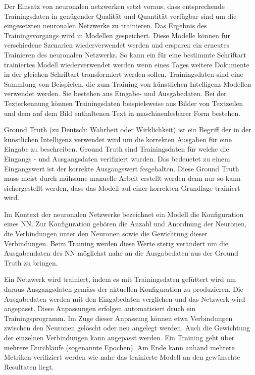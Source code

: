 \documentclass[a4paper,oneside, 12pt]{report}
\begin{document}
Der Einsatz von neuronalen netzwerken setzt voraus, dass entsprechende Trainingsdaten in genügender Qualität und Quantität verfügbar sind um die eingesetzten neuronalen Netzwerke zu trainieren. Das Ergebnis des Trainingsvorgangs wird in Modellen gespeichert. Diese Modelle können für verschiedene Szenarien wiederverwendet werden und ersparen ein erneutes Trainieren des neuronalen Netzwerks. So kann ein für eine bestimmte Schriftart trainiertes Modell wiederverwendet werden wenn eines Tages weitere Dokumente in der gleichen Schriftart transformiert werden sollen.
Trainingsdaten sind eine Sammlung von Beispielen, die zum Training von künstlichen Intelligenz Modellen verwendet werden. Sie bestehen aus Eingabe- und Ausgabedaten. Bei der Texterkennung können Trainingsdaten beispielsweise aus Bilder von Textzeilen und dem auf dem Bild enthaltenen Text in maschinenlesbarer Form bestehen. 

Ground Truth (zu Deutsch: Wahrheit oder Wirklichkeit) ist ein Begriff der in der künstlichen Intelligenz verwendet wird um die korrekten Ausgaben für eine Eingabe zu beschreiben. Ground Truth sind Trainingsdaten für welche die Eingangs - und Ausgangsdaten verifiziert wurden. Das bedeuetet zu einem Eingangswert ist der korrekte Ausgangswert fesgehalten. Diese Ground Truth muss meist durch mühsame manuelle Arbeit erstellt werden denn nur so kann sichergestellt werden, dass das Modell auf einer korrekten Grundlage trainiert wird.

Im Kontext der neuronalen Netzwerke bezeichnet ein Modell die Konfiguration eines \ac{NN}. Zur Konfiguration gehören die Anzahl und Anordnung der Neuronen, die Verbindungen unter den Neuronen sowie die Gewichtung dieser Verbindungen. Beim Training werden diese Werte stetig verändert um die Ausgabendaten des \ac{NN} möglichst nahe an die Ausgabedaten aus der Ground Truth zu bringen.

Ein Netzwerk wird trainiert, indem es mit Trainingsdaten gefüttert wird um daraus Ausgangsdaten gemäss der aktuellen Konfiguration zu produzieren. Die Ausgabedaten werden mit den Eingabedaten verglichen und das Netzwerk wird angepasst. Diese Anpassungen erfolgen automatisiert druch ein Trainingsprogramm. Im Zuge dieser Anpassung können etwa Verbindungen zwischen den Neuronen gelöscht oder neu angelegt werden. Auch die Gewichtung der einzelnen Verbindungen kann angepasst werden. Ein Training geht über mehrere Durchläufe (sogenannte Epochen). Am Ende kann anhand mehrere Metriken verifiziert werden wie nahe das trainierte Modell an den gewünschte Resultaten liegt.
\end{document}
